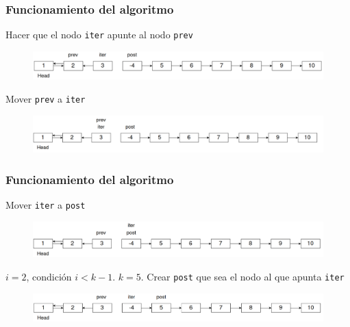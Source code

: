 \documentclass[17pt, t, lualatex]{beamer}
\newcommand{\cppinline}[1]{\lstinline[style=cppstyle]!#1!}
\begin{document}
\begin{frame}
  \frametitle{Funcionamiento del algoritmo}

  Hacer que el nodo \cppinline{iter} apunte al nodo \cppinline{prev}

  \begin{figure}[h]
    \centering
    \includegraphics[width=\textwidth]{img/fig10.png}
  \end{figure}

  Mover \cppinline{prev} a \cppinline{iter}

  \begin{figure}[h]
    \centering
    \includegraphics[width=\textwidth]{img/fig11.png}
  \end{figure}


\end{frame}

\begin{frame}
  \frametitle{Funcionamiento del algoritmo}

  Mover \cppinline{iter} a \cppinline{post}

  \begin{figure}[h]
    \centering
    \includegraphics[width=\textwidth]{img/fig12.png}
  \end{figure}

  $i = 2$, condición $i < k-1$. $k = 5$. Crear \cppinline{post} que sea el nodo al que apunta \cppinline{iter}

  \begin{figure}[h]
    \centering
    \includegraphics[width=\textwidth]{img/fig13.png}
  \end{figure}

\end{frame}
\end{document}

